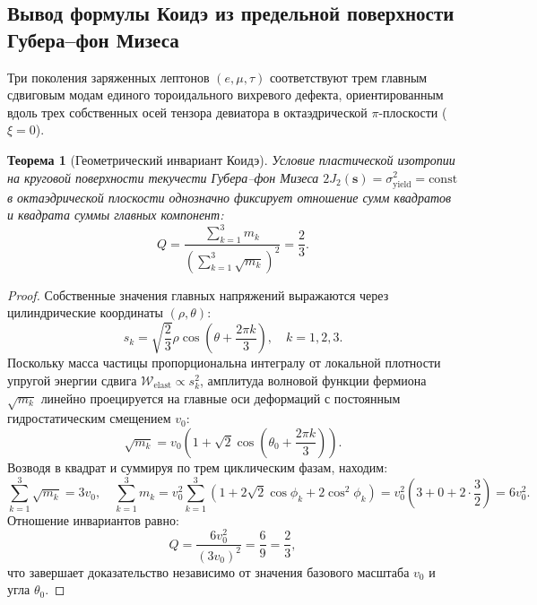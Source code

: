 \documentclass[12pt,a4paper]{article}
\newtheorem{theorem}{Теорема}[section]
\theoremstyle{definition}
\theoremstyle{remark}
\begin{document}
\subsection{Вывод формулы Коидэ из предельной поверхности Губера--фон Мизеса}
Три поколения заряженных лептонов $(e, \mu, \tau)$ соответствуют трем главным сдвиговым модам единого тороидального вихревого дефекта, ориентированным вдоль трех собственных осей тензора девиатора в октаэдрической $\pi$-плоскости ($\xi = 0$).

\begin{theorem}[Геометрический инвариант Коидэ]
	Условие пластической изотропии на круговой поверхности текучести Губера--фон Мизеса $2 J_2(\mathbf{s}) = \sigma_{\mathrm{yield}}^2 = \mathrm{const}$ в октаэдрической плоскости однозначно фиксирует отношение сумм квадратов и квадрата суммы главных компонент:
	\begin{equation}
		Q = \frac{\sum_{k=1}^3 m_k}{\left( \sum_{k=1}^3 \sqrt{m_k} \right)^2} = \frac{2}{3}.
		\label{eq:koide_exact}
	\end{equation}
\end{theorem}

\begin{proof}
	Собственные значения главных напряжений выражаются через цилиндрические координаты $(\rho, \theta)$:
	\begin{equation}
		s_k = \sqrt{\frac{2}{3}} \rho \cos\left( \theta + \frac{2\pi k}{3} \right), \quad k = 1, 2, 3.
		\label{eq:principal_stresses}
	\end{equation}
	Поскольку масса частицы пропорциональна интегралу от локальной плотности упругой энергии сдвига $\mathcal{W}_{\mathrm{elast}} \propto s_k^2$, амплитуда волновой функции фермиона $\sqrt{m_k}$ линейно проецируется на главные оси деформаций с постоянным гидростатическим смещением $v_0$:
	\begin{equation}
		\sqrt{m_k} = v_0 \left( 1 + \sqrt{2} \cos\left( \theta_0 + \frac{2\pi k}{3} \right) \right).
		\label{eq:koide_parametrization}
	\end{equation}
	Возводя в квадрат и суммируя по трем циклическим фазам, находим:
	\begin{equation}
		\sum_{k=1}^3 \sqrt{m_k} = 3 v_0, \quad \sum_{k=1}^3 m_k = v_0^2 \sum_{k=1}^3 \left( 1 + 2\sqrt{2}\cos\phi_k + 2\cos^2\phi_k \right) = v_0^2 \left( 3 + 0 + 2 \cdot \frac{3}{2} \right) = 6 v_0^2.
		\label{eq:koide_sum}
	\end{equation}
	Отношение инвариантов равно:
	\begin{equation}
		Q = \frac{6 v_0^2}{(3 v_0)^2} = \frac{6}{9} = \frac{2}{3},
		\label{eq:koide_proof_result}
	\end{equation}
	что завершает доказательство независимо от значения базового масштаба $v_0$ и угла $\theta_0$.
\end{proof}
\end{document}

